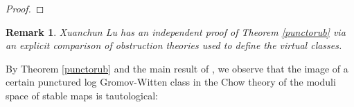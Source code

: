 \documentclass[12pt, oneside]{amsart}   	%
\newcounter{thm}
\newtheorem{remark}[thm]{Remark}
\numberwithin{equation}{section}
\numberwithin{thm}{section}
\numberwithin{figure}{section}
\begin{document}
\begin{proof}
%
%
%
%



 

\end{proof}

\begin{remark}
Xuanchun Lu has an independent proof of Theorem \ref{punctorub} via an explicit comparison of obstruction theories used to define the virtual classes.
\end{remark}

By Theorem \ref{punctorub} and the main result of \cite{DRtarget}, we observe that the image of a certain punctured log Gromov-Witten class in the Chow theory of the moduli space of stable maps is tautological:
\end{document}
